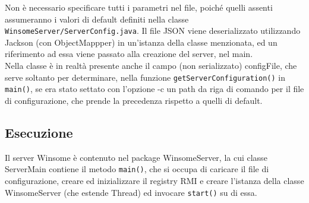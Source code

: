 Non è necessario specificare tutti i parametri nel file, poiché quelli assenti assumeranno i valori di default definiti nella classe \verb|WinsomeServer/ServerConfig.java|. Il file JSON viene deserializzato utilizzando Jackson (con ObjectMappper) in un'istanza della classe menzionata, ed un riferimento ad essa viene passato alla creazione del server, nel main.\\
Nella classe è in realtà presente anche il campo (non serializzato) configFile, che serve soltanto per determinare, nella funzione \verb|getServerConfiguration()| in \verb|main()|, se era stato settato con l'opzione -c un path da riga di comando per il file di configurazione, che prende la precedenza rispetto a quelli di default.

\subsection{Esecuzione}
Il server Winsome è contenuto nel package WinsomeServer, la cui classe ServerMain contiene
il metodo \verb|main()|, che si occupa di caricare il file di configurazione, creare ed inizializzare il registry RMI e creare l'istanza della classe WinsomeServer (che estende Thread) ed invocare \verb|start()| su di essa.\\